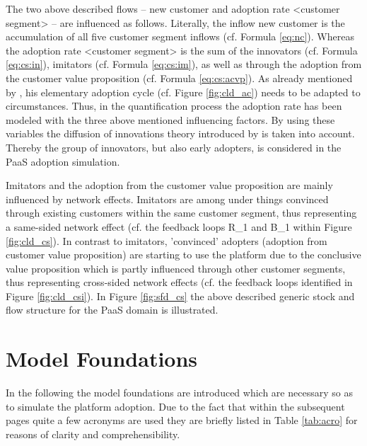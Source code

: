 The two above described flows -- new customer and adoption rate <customer segment>  -- are influenced as follows. Literally, the inflow new customer is the accumulation of all five customer segment inflows (cf. Formula \ref{eq:nc}). Whereas the adoption rate <customer segment> is the sum of the innovators (cf. Formula \ref{eq:cs:in}), imitators (cf. Formula \ref{eq:cs:im}), as well as through the adoption from the customer value proposition (cf. Formula \ref{eq:cs:acvp}). As already mentioned by \citet[p. 20]{Sterman2001}, his elementary adoption cycle (cf. Figure \ref{fig:cld_ac}) needs to be adapted to circumstances. Thus, in the quantification process the adoption rate has been modeled with the three above mentioned influencing factors. By using these variables the diffusion of innovations theory introduced by \citet{Rogers2003} is taken into account. Thereby the group of innovators, but also early adopters, is considered in the \ac{PaaS} adoption simulation.

Imitators and the adoption from the customer value proposition are mainly influenced by network effects. Imitators are among under things convinced through existing customers within the same customer segment, thus representing a same-sided network effect (cf. the feedback loops R\_1 and B\_1 within Figure \ref{fig:cld_cs}). In contrast to imitators, 'convinced' adopters (adoption from customer value proposition) are starting to use the platform due to the conclusive value proposition which is partly influenced through other customer segments, thus representing cross-sided network effects (cf. the feedback loops identified in Figure \ref{fig:cld_csi}). In Figure \ref{fig:sfd_cs} the above described generic stock and flow structure for the \ac{PaaS} domain is illustrated.

\section{Model Foundations}\label{ch:sfd:mf}
In the following the model foundations are introduced which are necessary so as to simulate the platform adoption. Due to the fact that within the subsequent pages quite a few acronyms are used they are briefly listed in Table \ref{tab:acro} for reasons of clarity and comprehensibility.

